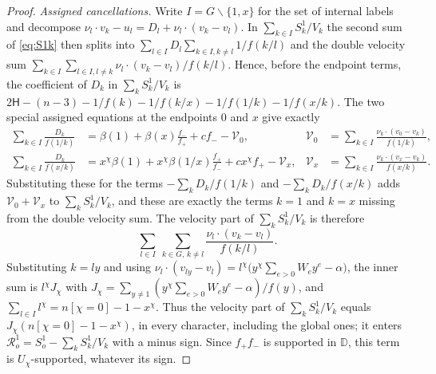 \documentclass{amsart}
\theoremstyle{definition}
\theoremstyle{remark}
\numberwithin{equation}{section}
\begin{document}
\begin{proof}
\emph{Assigned cancellations.} Write $I=G\smallsetminus\{1,x\}$ for the set of internal
labels and decompose $\nu_l\cdot v_k-u_l=D_l+\nu_l\cdot(v_k-v_l)$. In
$\sum_{k\in I}S^1_k/V_k$ the second sum of \eqref{eq:S1k} then splits into
$\sum_{l\in I}D_l\sum_{k\in I,k\ne l}1/f(k/l)$ and the double velocity sum
$\sum_{k\in I}\sum_{l\in I,l\ne k}\nu_l\cdot(v_k-v_l)/f(k/l)$. Hence, before the
endpoint terms, the coefficient of $D_k$ in $\sum_kS^1_k/V_k$ is
$2\mathsf H-(n-3)-1/f(k)-1/f(k/x)-1/f(1/k)-1/f(x/k)$. The two special assigned
equations at the endpoints $0$ and $x$ give exactly
\begin{align*}
  \sum_{k\in I}\frac{D_k}{f(1/k)}&=\beta(1)+\beta(x)\frac{f_-}{f_+}+cf_--\mathcal V_0,&
  \mathcal V_0&=\sum_{k\in I}\frac{\nu_k\cdot(v_0-v_k)}{f(1/k)},\\
  \sum_{k\in I}\frac{D_k}{f(x/k)}&=x^\chi\beta(1)+x^\chi\beta(1/x)\frac{f_+}{f_-}
     +cx^\chi f_+-\mathcal V_x,&
  \mathcal V_x&=\sum_{k\in I}\frac{\nu_k\cdot(v_x-v_k)}{f(x/k)} .
\end{align*}
Substituting these for the terms $-\sum_kD_k/f(1/k)$ and $-\sum_kD_k/f(x/k)$ adds
$\mathcal V_0+\mathcal V_x$ to $\sum_kS^1_k/V_k$, and these are exactly the terms $k=1$ and
$k=x$ missing from the double velocity sum. The velocity part of $\sum_kS^1_k/V_k$ is
therefore
\[
  \sum_{l\in I}\ \sum_{k\in G,\,k\ne l}\frac{\nu_l\cdot(v_k-v_l)}{f(k/l)} .
\]
Substituting $k=ly$ and using
$\nu_l\cdot(v_{ly}-v_l)=l^\chi\bigl(y^\chi\sum_{e>0}W_ey^e-\alpha\bigr)$, the inner sum is
$l^\chi J_\chi$ with $J_\chi=\sum_{y\ne1}(y^\chi\sum_{e>0}W_ey^e-\alpha)/f(y)$, and
$\sum_{l\in I}l^\chi=n[\chi=0]-1-x^\chi$. Thus the velocity part of $\sum_kS^1_k/V_k$ equals
$J_\chi(n[\chi=0]-1-x^\chi)$, in every character, including the global ones; it enters
$\mathcal R^1_o=S^1_o-\sum_kS^1_k/V_k$ with a minus sign. Since $f_+f_-$ is supported in
$\mathbb D$, this term is $U_\chi$-supported, whatever its sign.


\end{proof}
\end{document}
